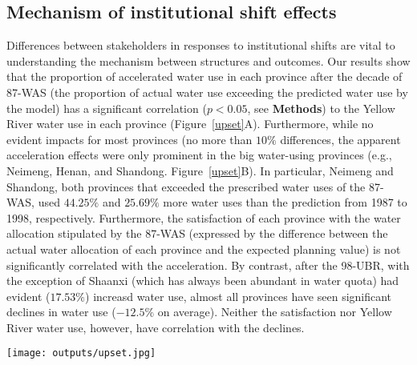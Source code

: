 
\subsection{Mechanism of institutional shift effects}
\label{result-2}

Differences between stakeholders in responses to institutional shifts are vital to understanding the mechanism between structures and outcomes.
Our results show that the proportion of accelerated water use in each province after the decade of 87-WAS (the proportion of actual water use exceeding the predicted water use by the model) has a significant correlation ($p<0.05$, see \textbf{Methods}) to the Yellow River water use in each province (Figure~\ref{upset}A).
Furthermore, while no evident impacts for most provinces (no more than $10\%$ differences, the apparent acceleration effects were only prominent in the big water-using provinces (e.g., Neimeng, Henan, and Shandong. Figure~\ref{upset}B).
In particular, Neimeng and Shandong, both provinces that exceeded the prescribed water uses of the 87-WAS, used $44.25\%$ and $25.69\%$ more water uses than the prediction from 1987 to 1998, respectively.
Furthermore, the satisfaction of each province with the water allocation stipulated by the 87-WAS (expressed by the difference between the actual water allocation of each province and the expected planning value) is not significantly correlated with the acceleration.
By contrast, after the 98-UBR, with the exception of Shaanxi (which has always been abundant in water quota) had evident ($17.53\%$) increasd water use, almost all provinces have seen significant declines in water use ($-12.5\%$ on average).
Neither the satisfaction nor Yellow River water use, however, have correlation with the declines.

\begin{figure*}[!h]
    \centering
    \texttt{[image: outputs/upset.jpg]}
    \caption{
        \textbf{A.} The partial correlation coefficient between wate uses (WU) of Yellow River (YR), unsatisfied ratio (compared with requirements in water plan and supply in the 87-WAS), and the average accelerated ratio.
        \textbf{B.} Average accelerated ratio of water uses for each province in the YRB during the decade after 87-WAS (from 1987 to 1998).
        \textbf{Mian users:} Major water consumption provinces (over the median).
        \textbf{Overused:} violate the 87-WAS in average water uses.
    }
    \label{upset}
\end{figure*}

